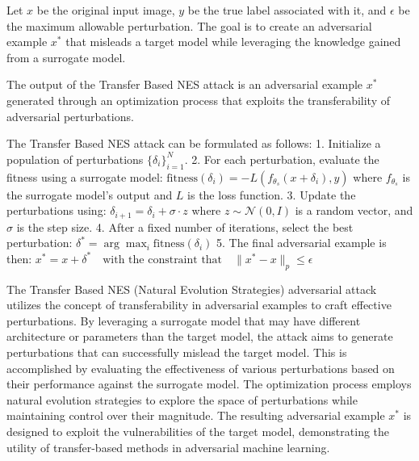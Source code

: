 Let $x$ be the original input image, $y$ be the true label associated with it, and $\epsilon$ be the maximum allowable perturbation. The goal is to create an adversarial example $x^*$ that misleads a target model while leveraging the knowledge gained from a surrogate model.

The output of the Transfer Based NES attack is an adversarial example $x^*$ generated through an optimization process that exploits the transferability of adversarial perturbations.

The Transfer Based NES attack can be formulated as follows:
1. Initialize a population of perturbations $\{\delta_i\}_{i=1}^N$.
2. For each perturbation, evaluate the fitness using a surrogate model:
   $\text{fitness}(\delta_i) = -L(f_{\theta_s}(x + \delta_i), y)$
   where $f_{\theta_s}$ is the surrogate model's output and $L$ is the loss function.
3. Update the perturbations using:
   $\delta_{i+1} = \delta_i + \sigma \cdot z$
   where $z \sim \mathcal{N}(0, I)$ is a random vector, and $\sigma$ is the step size.
4. After a fixed number of iterations, select the best perturbation:
   $\delta^* = \arg\max_{i} \text{fitness}(\delta_i)$
5. The final adversarial example is then:
   $x^* = x + \delta^* \quad \text{with the constraint that} \quad \|x^* - x\|_p \leq \epsilon$

The Transfer Based NES (Natural Evolution Strategies) adversarial attack utilizes the concept of transferability in adversarial examples to craft effective perturbations. By leveraging a surrogate model that may have different architecture or parameters than the target model, the attack aims to generate perturbations that can successfully mislead the target model. This is accomplished by evaluating the effectiveness of various perturbations based on their performance against the surrogate model. The optimization process employs natural evolution strategies to explore the space of perturbations while maintaining control over their magnitude. The resulting adversarial example $x^*$ is designed to exploit the vulnerabilities of the target model, demonstrating the utility of transfer-based methods in adversarial machine learning.
